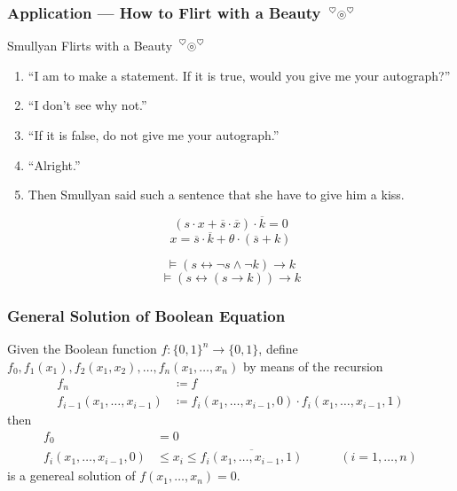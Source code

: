 \documentclass[UTF8,aspectratio=43,11pt,colorlinks,compress,openany]{beamer}%
\begin{document}
\begin{frame}\frametitle{Application --- How to Flirt with a Beauty $\sideset{^\heartsuit}{^\heartsuit}{\operatorname{\circledcirc}}$}
	\begin{block}{Smullyan Flirts with a Beauty $\sideset{^\heartsuit}{^\heartsuit}{\operatorname{\circledcirc}}$}
	\begin{enumerate}\small
		\item ``I am to make a statement. If it is true, would you give me your autograph?''
		\item ``I don't see why not.''
		\item ``If it is false, do not give me your autograph.''
		\item ``Alright.''
		\item Then Smullyan said such a sentence that she have to give him a kiss.
	\end{enumerate}
	\end{block}\pause
	\begin{solution}
		\[\left(s\cdot x+\overline{s}\cdot\overline{x}\right)\cdot\overline{k}=0\]
		\[x=\overline{s}\cdot\overline{k}+\theta\cdot(\overline{s}+k)\]
	\end{solution}\vspace{-2ex}
	\[\vDash(s\leftrightarrow\neg s\wedge\neg k)\to k\]
	\[\vDash(s\leftrightarrow(s\to k))\to k\]
\end{frame}

\begin{frame}\frametitle{General Solution of Boolean Equation}
	\begin{theorem}
		Given the Boolean function $f:\{0,1\}^n\to\{0,1\}$, define $f_0, f_1(x_1), f_2(x_1,x_2),\dots, f_n(x_1,\dots,x_n)$ by means of the recursion
		\begin{align*}
		f_n&\coloneqq f\\
		f_{i-1}(x_1,\dots,x_{i-1})&\coloneqq f_i(x_1,\dots,x_{i-1},0)\cdot f_i(x_1,\dots,x_{i-1},1)
		\end{align*}
		then
		\begin{align*}
		f_0&=0\\
		f_i(x_1,\dots,x_{i-1},0)&\leq x_i\leq\overline{f_i(x_1,\dots,x_{i-1},1)}\qquad\quad (i=1,\dots,n)
		\end{align*}
		is a genereal solution of $f(x_1,\dots,x_n)=0$.
	\end{theorem}
\end{frame}
\end{document}
